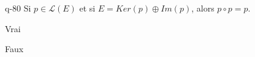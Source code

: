 \begin{truefalse}{q-80}
Si $p\in \mathcal{L}(E)$ et si $E=Ker(p)\oplus Im(p)$, alors $p\circ p=p$.
\item Vrai
\item* Faux
\end{truefalse}


